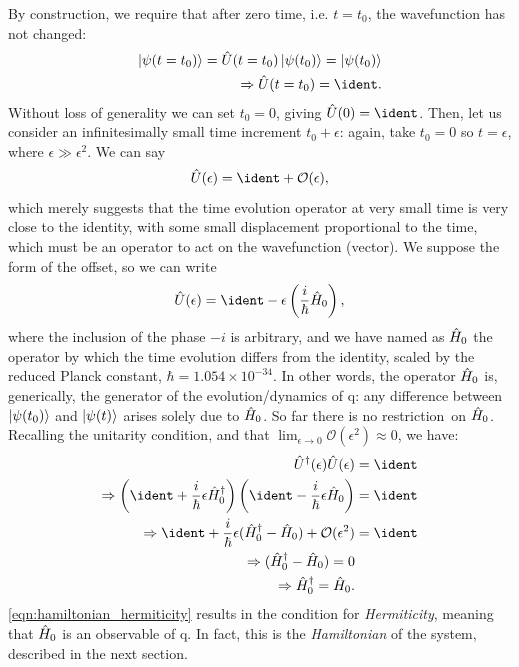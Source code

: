 By construction, we require that after zero time, i.e. $t = t_0$, the wavefunction has not changed:
\begin{equation}
    \begin{split}
        \ket{\psi(t = t_0)} = \hat{U}(t = t_0)\ket{\psi(t_0)} = \ket{\psi(t_0)}
        \\ \Rightarrow \hat{U}(t = t_0) = \ident.
    \end{split}
\end{equation}
Without loss of generality we can set $t_0 = 0$, giving $\hat{U}(0) = \ident$. 
Then, let us consider an infinitesimally small time increment $t_0 + \epsilon$:
    again, take $t_0 = 0$ so $t = \epsilon$,  where $\epsilon \gg \epsilon^2$. 
We can say
\begin{equation}
    \hat{U}(\epsilon) = \ident + \mathcal{O}(\epsilon),
\end{equation}
which merely suggests that the time evolution operator
    at very small time is very close to the identity, with some small displacement proportional to the time,
    which must be an operator to act on the wavefunction (vector).
We suppose the form of the offset, so we can write
\begin{equation}
    \hat{U}(\epsilon) = \ident - \epsilon \left(\frac{i}{\hbar} \ho \right),
\end{equation}
    where the inclusion of the phase $-i$ is arbitrary, 
    and we have named as $\hat{H}_0$ the operator by which the time evolution differs from the identity,
    scaled by the reduced Planck constant, $\hbar = 1.054 \times 10^{-34}$.
In other words, the operator $\hat{H}_0$ is, generically, the generator of the evolution/dynamics of \gls{q}:
    any difference between $\ket{\psi(t_0)}$ and $\ket{\psi(t)}$ arises solely due to $\hat{H}_0$. 
So far there is no restriction\footnotemark \ on $\hat{H}_0$.
Recalling the unitarity condition, and that $\lim_{\epsilon \rightarrow 0} \mathcal{O}(\epsilon^2) \approx 0$, 
    we have:
\begin{equation}
    \label{eqn:hamiltonian_hermiticity}
    \begin{split}
        \hat{U}^{\dag}(\epsilon) \hat{U}(\epsilon) &= \ident
        \\ 
        \Rightarrow 
        \left( \ident + \frac{i}{\hbar} \epsilon \ho^\dag \right) \left( \ident - \frac{i}{\hbar} \epsilon \ho \right)  &= \ident
        \\
        \Rightarrow
        \ident +  \frac{i}{\hbar} \epsilon (\ho^{\dag} - \ho) + \mathcal{O}(\epsilon^2) &= \ident
        \\
        \Rightarrow
        (\ho^{\dag} - \ho) = 0 
        \\
        \Rightarrow
        \ho^{\dag} = \ho.
    \end{split}
\end{equation}
\cref{eqn:hamiltonian_hermiticity} results in the condition for \emph{Hermiticity}, 
    meaning that $\hat{H}_0$ is an observable of \gls{q}. 
In fact, this is the \emph{Hamiltonian} of the system, described in the next section. 

